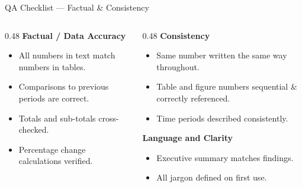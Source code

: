 \documentclass[xcolor={table,dvipsnames},aspectratio=169,11pt]{beamer}
\begin{document}
\begin{frame}{QA Checklist --- Factual \& Consistency}
    \begin{columns}[t]
        \begin{column}{0.48\textwidth}
            \textbf{Factual / Data Accuracy}
            \begin{itemize}
                \item[$\square$] All numbers in text match numbers in tables.
                \item[$\square$] Comparisons to previous periods are correct.
                \item[$\square$] Totals and sub-totals cross-checked.
                \item[$\square$] Percentage change calculations verified.
            \end{itemize}
        \end{column}
        \begin{column}{0.48\textwidth}
            \textbf{Consistency}
            \begin{itemize}
                \item[$\square$] Same number written the same way throughout.
                \item[$\square$] Table and figure numbers sequential \& correctly referenced.
                \item[$\square$] Time periods described consistently.
            \end{itemize}
            \vskip 0.2cm
            \textbf{Language and Clarity}
            \begin{itemize}
                \item[$\square$] Executive summary matches findings.
                \item[$\square$] All jargon defined on first use.
            \end{itemize}
        \end{column}
    \end{columns}
\end{frame}
\end{document}
